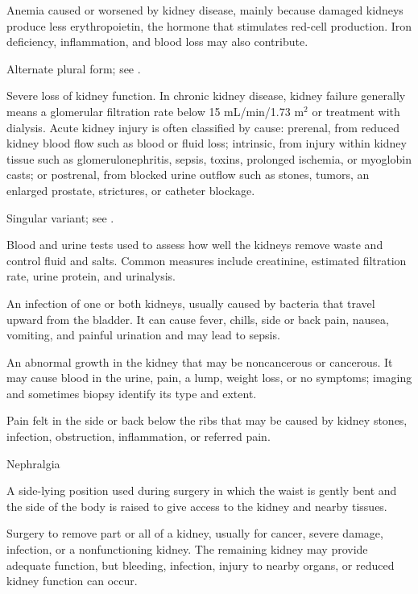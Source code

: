  Anemia caused or worsened by kidney disease, mainly because damaged kidneys produce less erythropoietin, the hormone that stimulates red-cell production. Iron deficiency, inflammation, and blood loss may also contribute.

 Alternate plural form; see .

 Severe loss of kidney function. In chronic kidney disease, kidney failure generally means a
glomerular filtration rate below 15 mL/min/1.73 m$^2$ or treatment with dialysis. Acute kidney injury is often
classified by cause: prerenal, from reduced kidney blood flow such as blood or fluid loss; intrinsic, from injury
within kidney tissue such as glomerulonephritis, sepsis, toxins, prolonged ischemia, or myoglobin casts; or
postrenal, from blocked urine outflow such as stones, tumors, an enlarged prostate, strictures, or catheter blockage.

 Singular variant; see .

 Blood and urine tests used to assess how well the kidneys remove waste and control fluid and salts. Common measures include creatinine, estimated filtration rate, urine protein, and urinalysis.

 An infection of one or both kidneys, usually caused by bacteria that travel upward from the bladder. It can cause fever, chills, side or back pain, nausea, vomiting, and painful urination and may lead to sepsis.

 An abnormal growth in the kidney that may be noncancerous or cancerous. It may cause blood in the urine, pain, a lump, weight loss, or no symptoms; imaging and sometimes biopsy identify its type and extent.

 Pain felt in the side or back below the ribs that may be caused by kidney stones, infection, obstruction, inflammation, or referred pain.

\synonyms
Nephralgia

 A side-lying position used during surgery in which the waist is gently bent and the side of the body is raised to give access to the kidney and nearby tissues.

 Surgery to remove part or all of a kidney, usually for cancer, severe damage, infection, or a nonfunctioning kidney. The remaining kidney may provide adequate function, but bleeding, infection, injury to nearby organs, or reduced kidney function can occur.


